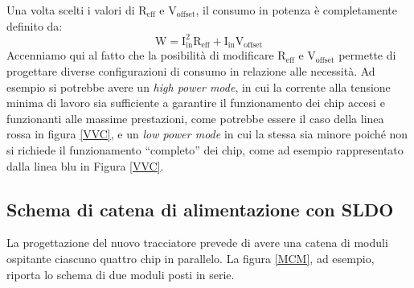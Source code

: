 Una volta scelti i valori di $\mathrm{R_{eff}}$ e $\mathrm{V_{offset}}$, il consumo in potenza è completamente definito da:
\begin{equation}
\mathrm{W=I_{in}^2R_{eff}+I_{in}V_{offset}}
\end{equation}
Accenniamo qui al fatto che la posibilità di modificare $\mathrm{R_{eff}}$ e $\mathrm{V_{offset}}$ permette di progettare diverse configurazioni di consumo in relazione alle necessità.
Ad esempio si potrebbe avere un \textit{high power mode}, in cui la corrente alla tensione minima di lavoro sia sufficiente a garantire il funzionamento dei chip accesi e funzionanti alle massime prestazioni, come potrebbe essere il caso della linea rossa in figura \ref{VVC}, e un \textit{low power mode} in cui la stessa sia minore poiché non si richiede il funzionamento ``completo'' dei chip, come ad esempio rappresentato dalla linea blu in Figura \ref{VVC}.


\subsection{Schema di catena di alimentazione con SLDO}

La progettazione del nuovo tracciatore prevede di avere una catena di moduli ospitante ciascuno quattro chip in parallelo.
La figura \ref{MCM}, ad esempio, riporta lo schema di due moduli posti in serie.

